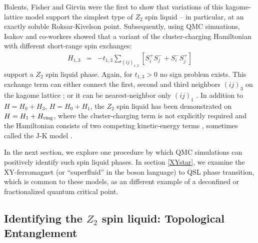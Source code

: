 \documentclass[range]{ar2e}
\begin{document}
Balents, Fisher and Girvin \cite{BFG} were the first to show that variations of this kagome-lattice model support the simplest type of $Z_2$ spin liquid -- in particular, at an exactly soluble Roksar-Kivelson point.  Subsequently, using QMC simuations, Isakov and co-workers showed that a variant of the cluster-charging Hamiltonian with different short-range spin exchanges: 
\begin{eqnarray}
H_{1,3} &=& -t_{1,3} \sum_{( ij )_{1,3}} [S^{+}_i S^-_j + S^-_i S^{+}_j]  
\end{eqnarray}
support a $Z_2$ spin liquid phase.  Again, for $t_{1,3}>0$ no sign problem exists.  This exchange term can either connect the first, second and third neighbors $( ij )_3$ on the kagome lattice \cite{Isakov1,Isakov2}; or it can be nearest-neighbor only $( ij )_1$ \cite{TopoEE}.  
In addition to  $H = H_0 + H_3$, $H = H_0 + H_1$, the $Z_2$ spin liquid has been demonstrated on $H = H_1 + H_{\rm ring}$, where the cluster-charging term is not explicitly required and the Hamiltonian consists of two competing kinetic-energy terms \cite{Long}, sometimes called the J-K model \cite{JKqmc}.



In the next section, we explore one procedure by which QMC simulations can positively identify such spin liquid phases.  In section \ref{XYstar}, we examine the XY-ferromagnet (or ``superfluid'' in the boson language) to QSL phase transition, which is common to these models, as an different example of a deconfined or fractionalized quantum critical point.

\subsection{Identifying the $Z_2$ spin liquid: Topological Entanglement} 
\label{topoEEsec}
\end{document}
